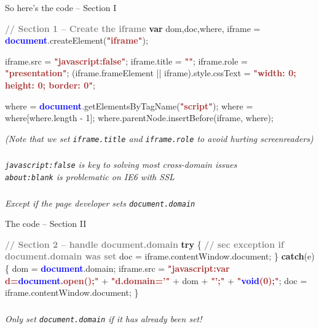 \documentclass{beamer}
\newcommand{\innersplash}[1]{
  \begin{center}
    \Large \textrm{\textit{ #1 } }
  \end{center}
}
\newcommand{\splashslide}[2][{}]{
  \begin{frame}
  \frametitle{#1}
  \innersplash{#2}
  \end{frame}
}
\def\gray<#1>#2{\textcolor<#1>{gray}{\textbf<#1>{#2}}}
\def\brown<#1>#2{\textcolor<#1>{brown}{\textbf<#1>{#2}}}
\def\green<#1>#2{\textcolor<#1>{dark-green}{\textbf<#1>{#2}}}
\def\blue<#1>#2{\textcolor<#1>{blue}{\textbf<#1>{#2}}}
\begin{document}
\begin{frame}[fragile]{So here's the code -- Section I}
\begin{semiverbatim}
\gray<1>{// Section 1 -- Create the iframe}
\green<1>{var} dom,doc,where,
    iframe = \blue<1>{document}.createElement(\brown<1>{"iframe"});

iframe.src = \brown<1>{"javascript:false"};
iframe.title = \brown<1>{""}; iframe.role = \brown<1>{"presentation"};
(iframe.frameElement || iframe).style.cssText =
    \brown<1>{"width: 0; height: 0; border: 0"};

where = \blue<1>{document}.getElementsByTagName(\brown<1>{"script"});
where = where[where.length - 1];
where.parentNode.insertBefore(iframe, where);
\end{semiverbatim}
\begin{center} \textrm{\textit{\small (Note that we set \texttt{iframe.title} and \texttt{iframe.role} to avoid hurting screenreaders)}} \end{center}
\end{frame}


\splashslide{\texttt{javascript:false} is key to solving most cross-domain issues \\ \vspace{2 cm} \tiny \texttt{about:blank} is problematic on IE6 with SSL}

\splashslide{Except if the page developer sets \texttt{document.domain}}

\begin{frame}
\end{frame}


\begin{frame}[fragile]{The code -- Section II}
\begin{semiverbatim}
\gray<1>{// Section 2 -- handle document.domain}
\green<1>{try} \{
    \gray<1>{// sec exception if document.domain was set}
    doc = iframe.contentWindow.document;
\}
\green<1>{catch}(e) \{
    dom = \blue<1>{document}.domain;
    iframe.src = 
        \brown<1>{"javascript:\green<1>{var} d=\blue<1>{document}.open();"} +
        \brown<1>{"d.domain='"} + dom + \brown<1>{"';"} + 
        \brown<1>{"\blue<1>{void}(0);"};
    doc = iframe.contentWindow.document;
\}
\end{semiverbatim}
\end{frame}

\splashslide{Only set \texttt{document.domain} if it has already been set!}
\end{document}
